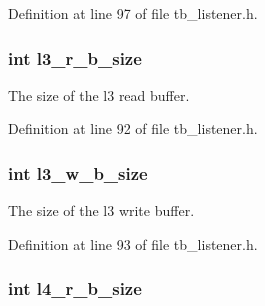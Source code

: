 Definition at line 97 of file tb\-\_\-listener.\-h.

\hypertarget{structtb__test__params__t_aa9d1ab0c9c6ef33a4b6bd60172dd0ec5}{
\subsubsection[{l3\-\_\-r\-\_\-b\-\_\-size}]{\setlength{\rightskip}{0pt plus 5cm}int l3\-\_\-r\-\_\-b\-\_\-size}}\label{structtb__test__params__t_aa9d1ab0c9c6ef33a4b6bd60172dd0ec5}


The size of the l3 read buffer. 



Definition at line 92 of file tb\-\_\-listener.\-h.

\hypertarget{structtb__test__params__t_aee0e87ac541b0694deb1499aa3371f91}{
\subsubsection[{l3\-\_\-w\-\_\-b\-\_\-size}]{\setlength{\rightskip}{0pt plus 5cm}int l3\-\_\-w\-\_\-b\-\_\-size}}\label{structtb__test__params__t_aee0e87ac541b0694deb1499aa3371f91}


The size of the l3 write buffer. 



Definition at line 93 of file tb\-\_\-listener.\-h.

\hypertarget{structtb__test__params__t_a8ae9ae9a85fbb77bc460b0d43e4fc1c5}{
\subsubsection[{l4\-\_\-r\-\_\-b\-\_\-size}]{\setlength{\rightskip}{0pt plus 5cm}int l4\-\_\-r\-\_\-b\-\_\-size}}\label{structtb__test__params__t_a8ae9ae9a85fbb77bc460b0d43e4fc1c5}


